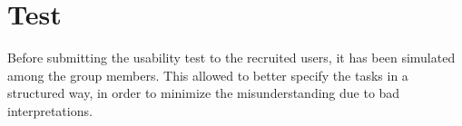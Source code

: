 \documentclass[../../UsabilityReport.tex]{subfiles}
\begin{document}
\section{Test}
	Before submitting the usability test to the recruited users, it has been simulated among the group members. This allowed to better specify the tasks in a structured way, in order to minimize the misunderstanding due to bad interpretations.
\end{document}
